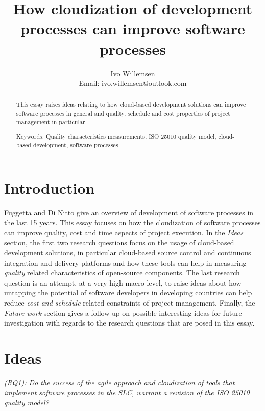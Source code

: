 \documentclass[a4paper, 10pt, conference]{ieeeconf}
\title{How cloudization of development processes can improve software processes}
\author{Ivo Willemsen\\
Email: ivo.willemsen@outlook.com}
\begin{document}
\maketitle
\thispagestyle{empty}
\pagestyle{empty}

\begin{abstract}

This essay raises ideas relating to how cloud-based development solutions can improve software processes in general and quality, schedule and cost properties of project management in particular 

\vspace{3 mm}

Keywords: Quality characteristics measurements, ISO 25010 quality model, cloud-based development, software processes
\end{abstract}

\section{Introduction}
Fuggetta and Di Nitto \cite{fuggetta2014} give an overview of development of software processes in the last 15 years. This essay focuses on how the cloudization of software processes can improve quality, cost and time aspects of project execution. In the \textit{Ideas} section, the first two research questions focus on the usage of cloud-based development solutions, in particular cloud-based source control and continuous integration and delivery platforms and how these tools can help in measuring \textit{quality} related characteristics of open-source components. The last research question is an attempt, at a very high macro level, to raise ideas about how untapping the potential of software developers in developing countries can help reduce \textit{cost and schedule} related constraints of project management. Finally, the \textit{Future work} section gives a follow up on possible interesting ideas for future investigation with regards to the research questions that are posed in this essay.
\section{Ideas}

\textit{(RQ1): Do the success of the agile approach and cloudization of tools that implement software  processes in the SLC, warrant a revision of the ISO 25010 quality model?}
\end{document}
